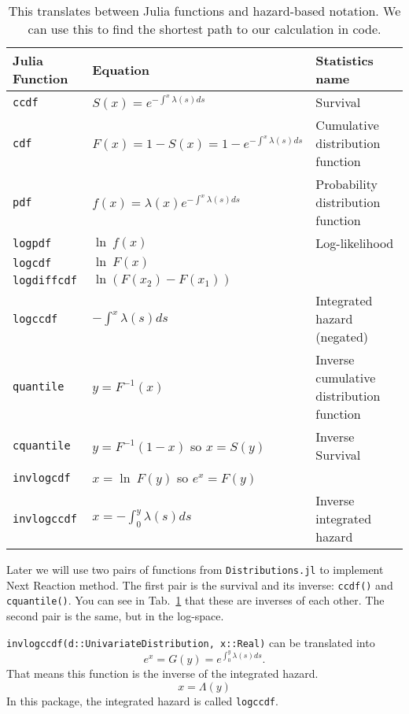 \documentclass{article}
\begin{document}
\begin{table}
\begin{tabular}{|lll|} \hline
	Julia Function & Equation & Statistics name \\ \hline
	\texttt{ccdf} & $S(x) = e^{-\int^x\lambda(s)ds}$ & Survival \\
	\texttt{cdf} & $F(x) = 1 - S(x) = 1-e^{-\int^x\lambda(s)ds}$ & Cumulative distribution function \\
	\texttt{pdf} & $f(x) = \lambda(x)e^{-\int^x\lambda(s)ds}$ & Probability distribution function \\
	\texttt{logpdf} & $\ln\:f(x)$ & Log-likelihood \\
	\texttt{logcdf} & $\ln\:F(x)$ & \\
	\texttt{logdiffcdf} & $\ln\left(F(x_2)-F(x_1)\right)$ & \\
	\texttt{logccdf} & $-\int^x\lambda(s)ds$ & Integrated hazard (negated) \\
	\texttt{quantile} & $y = F^{-1}(x)$ & Inverse cumulative distribution function \\
	\texttt{cquantile} & $y = F^{-1}(1-x)$ so $x = S(y)$ & Inverse Survival \\
	\texttt{invlogcdf} & $x = \ln\:F(y)$ so $e^x = F(y)$ & \\
	\texttt{invlogccdf} & $x = -\int_0^y\lambda(s)ds$ & Inverse integrated hazard \\ \hline
\end{tabular}
\caption{This translates between Julia functions and hazard-based notation. We can use this to find
the shortest path to our calculation in code.\label{julia-translation}}
\end{table}

Later we will use two pairs of functions from \texttt{Distributions.jl} to implement Next Reaction method. The first pair is the survival and its inverse: \texttt{ccdf()} and \texttt{cquantile()}. You can see in Tab.~\ref{julia-translation} that these are inverses of each other. The second pair is the same, but in the log-space.

\texttt{invlogccdf(d::UnivariateDistribution, x::Real)} can be translated into
\begin{equation}
e^x = G(y) = e^{\int_0^y\lambda(s)ds}.
\end{equation}
That means this function is the inverse of the integrated hazard.
\begin{equation}
x = \Lambda(y)
\end{equation}
In this package, the integrated hazard is called \texttt{logccdf}.
\end{document}
